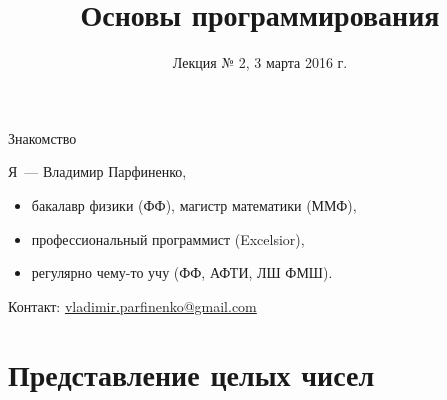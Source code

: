 %



\usepackage{pgfpages}

\usepackage{listings}

\newcommand{\reduceBlockEqSpacing}{%
  \vspace*{-\baselineskip}\setlength\belowdisplayshortskip{0pt}%
}

\usepackage{numprint}
\newcommand{\num}[1]{\numprint{#1}}
  \npthousandsep{\,}
  \npthousandthpartsep{}
  \npdecimalsign{,}

\newcommand{\pcnum}[1]{\ensuremath{\mathtt{#1}}}
\newcommand{\bin}[1]{\pcnum{#1}_2}
\newcommand{\hex}[1]{\pcnum{#1}_{16}}

\newcommand{\code}[1]{\texttt{#1}}

\title{Основы программирования}
\subtitle{Лекция № 2, 3 марта 2016 г.}
\date{}




\begin{frame}[plain]
  \titlepage
\end{frame}

\begin{frame}{Знакомство}

  Я~--- Владимир Парфиненко,

  \begin{itemize}
    \item бакалавр физики (ФФ), магистр математики (ММФ),
    \item профессиональный программист (Excelsior),
    \item регулярно чему-то учу (ФФ, АФТИ, ЛШ ФМШ).
  \end{itemize}

  Контакт:
  \href{mailto:vladimir.parfinenko@gmail.com}{vladimir.parfinenko@gmail.com}

\end{frame}

\section{Представление целых чисел}

